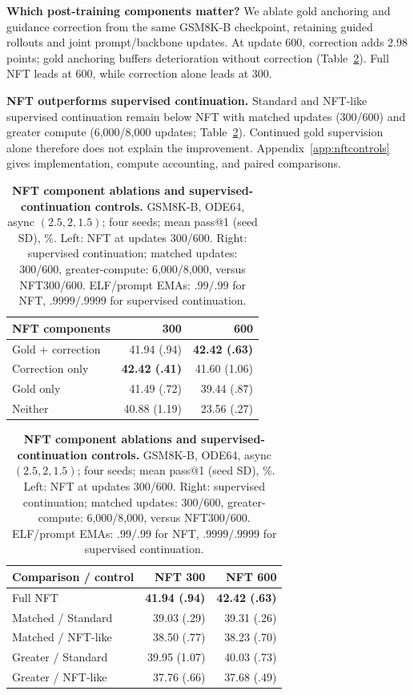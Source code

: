 \documentclass{article}
\newcommand{\rev}[1]{{\color{blue}#1}}
\newenvironment{revision}{\begingroup\color{blue}}{\endgroup}
\begin{document}
\begin{revision}
\textbf{Which post-training components matter?}
We ablate gold anchoring and guidance correction from the same GSM8K-B checkpoint, retaining guided rollouts and joint prompt/backbone updates. At update 600, correction adds 2.98 points; gold anchoring buffers deterioration without correction (Table~\ref{tab:nftablations}). Full NFT leads at 600, while correction alone leads at 300.

\textbf{NFT outperforms supervised continuation.}
Standard and NFT-like supervised continuation remain below NFT with matched updates (300/600) and greater compute (6,000/8,000 updates; Table~\ref{tab:nftablations}). Continued gold supervision alone therefore does not explain the improvement. Appendix~\ref{app:nftcontrols} gives implementation, compute accounting, and paired comparisons.
\end{revision}
\begin{table}[!htb]\color{blue}
\centering\small
\begin{revision}
\caption{\textbf{NFT component ablations and supervised-continuation controls.} GSM8K-B, ODE64, async $(2.5,2,1.5)$; \rev{four seeds; mean pass@1 (seed SD), \%. Left: NFT at updates 300/600.} Right: supervised continuation; matched updates: 300/600, \rev{greater-compute: 6,000/8,000, versus NFT300/600.} ELF/prompt EMAs: $.99/.99$ for NFT, $.9999/.9999$ for supervised continuation.}
\label{tab:nftablations}
\begin{minipage}[t]{.46\linewidth}\centering
\setlength{\tabcolsep}{3pt}
\begin{tabular}{@{}lrr@{}}
\toprule
NFT components & 300 & 600\\\midrule
Gold + correction & 41.94 (.94) & \textbf{42.42 (.63)}\\
Correction only & \textbf{42.42 (.41)} & 41.60 (1.06)\\
Gold only & 41.49 (.72) & 39.44 (.87)\\
Neither & 40.88 (1.19) & 23.56 (.27)\\
\bottomrule
\end{tabular}
\end{minipage}\hfill
\begin{minipage}[t]{.52\linewidth}\centering
\setlength{\tabcolsep}{3pt}
\begin{tabular}{@{}lrr@{}}
\toprule
Comparison / control & NFT 300 & NFT 600\\\midrule
Full NFT & \textbf{41.94 (.94)} & \textbf{42.42 (.63)}\\
Matched / Standard & 39.03 (.29) & 39.31 (.26)\\
Matched / NFT-like & 38.50 (.77) & 38.23 (.70)\\
Greater / Standard & 39.95 (1.07) & 40.03 (.73)\\
Greater / NFT-like & 37.76 (.66) & 37.68 (.49)\\
\bottomrule
\end{tabular}
\end{minipage}
\end{revision}
\end{table}
\end{document}
